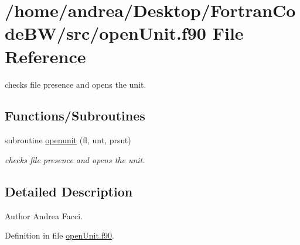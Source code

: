 \hypertarget{open_unit_8f90}{\section{/home/andrea/\-Desktop/\-Fortran\-Code\-B\-W/src/open\-Unit.f90 File Reference}
\label{open_unit_8f90}
}


checks file presence and opens the unit.  


\subsection*{Functions/\-Subroutines}
\begin{DoxyCompactItemize}
\item 
subroutine \hyperlink{open_unit_8f90_abaa0a5d0ffc5b96b5d090ddb8f7be6ad}{openunit} (fl, unt, prsnt)
\begin{DoxyCompactList}\small\item\em checks file presence and opens the unit. \end{DoxyCompactList}\end{DoxyCompactItemize}


\subsection{Detailed Description}
\begin{DoxyAuthor}{Author}
Andrea Facci. 
\end{DoxyAuthor}


Definition in file \hyperlink{open_unit_8f90_source}{open\-Unit.\-f90}.



